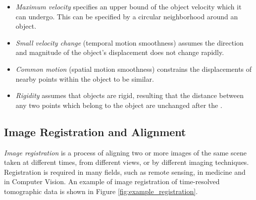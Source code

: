 \begin{itemize}
	\item \textit{Maximum velocity} specifies an upper bound of the object velocity which it can undergo. This can be specified by a circular neighborhood around an object.
	\item \textit{Small velocity change} (temporal motion smoothness) assumes the direction and magnitude of the object's displacement does not change rapidly.
	\item \textit{Common motion} (spatial motion smoothness) constrains the displacements of nearby points within the object to be similar.
	\item \textit{Rigidity} assumes that objects are rigid, resulting that the distance between
any two points which belong to the object are unchanged after the .
\end{itemize}



%
%
%
%


\subsection{Image Registration and Alignment}
\label{image_registration}


\textit{Image registration} is a process of aligning two or
more images of the same scene taken at different times,
from different views, or by different imaging techniques.  Registration is required in many fields, such as remote sensing, in medicine and in Computer Vision. An example of image registration of time-resolved tomographic data is shown in Figure \ref{fig:example_registration}.


